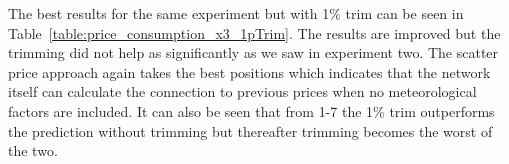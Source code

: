 \begin{table}[H]
\centering  %
\caption{Calculated inputs on Price \& demand with no trim.} %
\label{table:price_consumption_x3} %
\end{table}

The best results for the same experiment but with 1\% trim can be seen in Table~\ref{table:price_consumption_x3_1pTrim}. The results are improved but the trimming did not help as significantly as we saw in experiment two. The scatter price approach again takes the best positions which indicates that the network itself can calculate the connection to previous prices when no meteorological factors are included. It can also be seen that from 1-7 the 1\% trim outperforms the prediction without trimming but thereafter trimming becomes the worst of the two.

